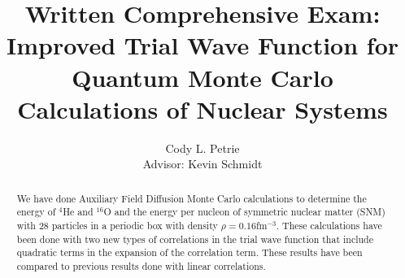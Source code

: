 \documentclass[12pt]{article}
\title{{\large Written Comprehensive Exam:}\\Improved Trial Wave Function for Quantum Monte Carlo Calculations of Nuclear Systems}
\author{Cody L. Petrie \\
Advisor: Kevin Schmidt}
\begin{document}
\maketitle

\begin{abstract}
We have done Auxiliary Field Diffusion Monte Carlo calculations to determine the energy of $^{4}$He and $^{16}$O and the energy per nucleon of symmetric nuclear matter (SNM) with 28 particles in a periodic box with density $\rho=0.16$fm$^{-3}$. These calculations have been done with two new types of correlations in the trial wave function that include quadratic terms in the expansion of the correlation term. These results have been compared to previous results done with linear correlations.
\end{abstract}







%





\clearpage


\end{document}
